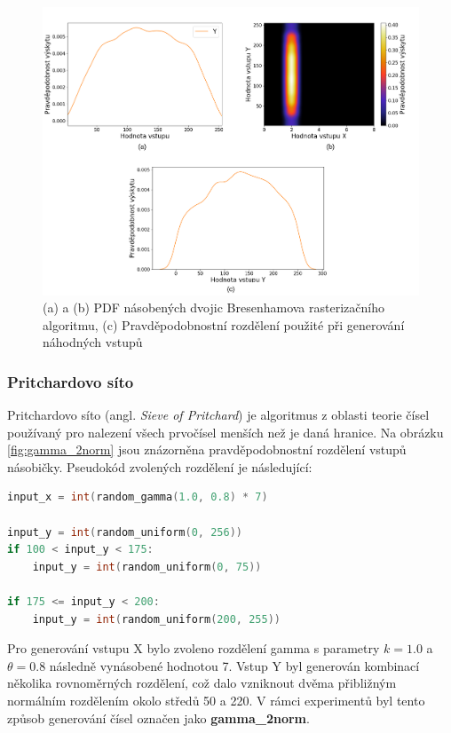 \begin{figure}[H]
    \centering
    \includegraphics[width=\textwidth]{obrazky-figures/const_norm_all.png}
    \caption{(a) a (b) PDF násobených dvojic Bresenhamova rasterizačního algoritmu, (c) Pravděpodobnostní rozdělení použité při generování náhodných vstupů}
    \label{fig:const_norm}
\end{figure}

\pagebreak

\subsubsection{Pritchardovo síto}
Pritchardovo síto (angl. \textit{Sieve of Pritchard}) je algoritmus z oblasti teorie čísel používaný pro nalezení všech prvočísel menších než je daná hranice. Na obrázku \ref{fig:gamma_2norm} jsou znázorněna pravděpodobnostní rozdělení vstupů násobičky. Pseudokód zvolených rozdělení je následující:

\begin{lstlisting}[language={C}, label={lst:pritchard}]
input_x = int(random_gamma(1.0, 0.8) * 7)

input_y = int(random_uniform(0, 256))
if 100 < input_y < 175:
    input_y = int(random_uniform(0, 75))

if 175 <= input_y < 200:
    input_y = int(random_uniform(200, 255))
\end{lstlisting}

Pro generování vstupu X bylo zvoleno rozdělení gamma s parametry $k = 1.0$ a $\theta = 0.8$ následně vynásobené hodnotou 7. Vstup Y byl generován kombinací několika rovnoměrných rozdělení, což dalo vzniknout dvěma přibližným normálním rozdělením okolo středů 50 a 220. V rámci experimentů byl tento způsob generování čísel označen jako \textbf{gamma\_2norm}.

